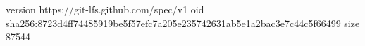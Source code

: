 version https://git-lfs.github.com/spec/v1
oid sha256:8723d4ff74485919be5f57efc7a205e235742631ab5e1a2bac3e7c44c5f66499
size 87544
